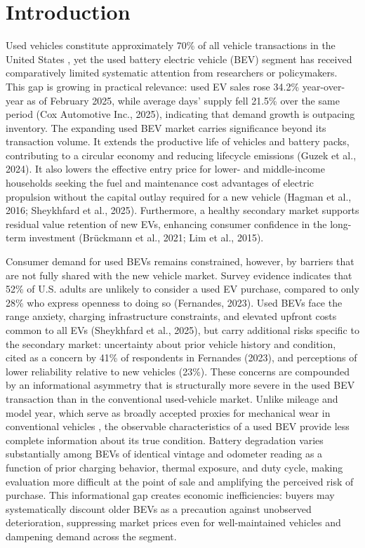 \documentclass[a4paper,fleqn]{cas-sc}   %
\begin{document}
\maketitle
\renewcommand{\baselinestretch}{1}\normalsize
\section{Introduction}
\label{section:intro}

Used vehicles constitute approximately 70\% of all vehicle transactions in the United States \parencite{bts2023}, yet the used battery electric vehicle (BEV) segment has received comparatively limited systematic attention from researchers or policymakers. This gap is growing in practical relevance: used EV sales rose 34.2\% year-over-year as of February 2025, while average days’ supply fell 21.5\% over the same period (Cox Automotive Inc., 2025), indicating that demand growth is outpacing inventory. The expanding used BEV market carries significance beyond its transaction volume. It extends the productive life of vehicles and battery packs, contributing to a circular economy and reducing lifecycle emissions (Guzek et al., 2024). It also lowers the effective entry price for lower- and middle-income households seeking the fuel and maintenance cost advantages of electric propulsion without the capital outlay required for a new vehicle (Hagman et al., 2016; Sheykhfard et al., 2025). Furthermore, a healthy secondary market supports residual value retention of new EVs, enhancing consumer confidence in the long-term investment (Brückmann et al., 2021; Lim et al., 2015).

Consumer demand for used BEVs remains constrained, however, by barriers that are not fully shared with the new vehicle market. Survey evidence indicates that 52\% of U.S. adults are unlikely to consider a used EV purchase, compared to only 28\% who express openness to doing so (Fernandes, 2023). Used BEVs face the range anxiety, charging infrastructure constraints, and elevated upfront costs common to all EVs (Sheykhfard et al., 2025), but carry additional risks specific to the secondary market: uncertainty about prior vehicle history and condition, cited as a concern by 41\% of respondents in Fernandes (2023), and perceptions of lower reliability relative to new vehicles (23\%). These concerns are compounded by an informational asymmetry that is structurally more severe in the used BEV transaction than in the conventional used-vehicle market. Unlike mileage and model year, which serve as broadly accepted proxies for mechanical wear in conventional vehicles \parencite{prieto2015}, the observable characteristics of a used BEV provide less complete information about its true condition. Battery degradation varies substantially among BEVs of identical vintage and odometer reading as a function of prior charging behavior, thermal exposure, and duty cycle, making evaluation more difficult at the point of sale and amplifying the perceived risk of purchase. This informational gap creates economic inefficiencies: buyers may systematically discount older BEVs as a precaution against unobserved deterioration, suppressing market prices even for well-maintained vehicles and dampening demand across the segment.
\end{document}
